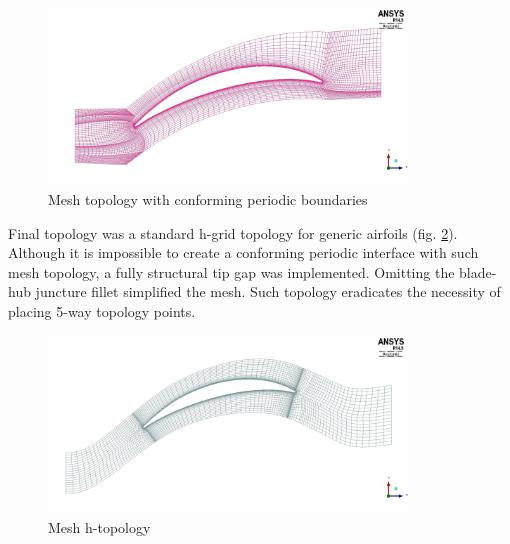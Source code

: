 \begin{figure}[h!]
\centering %
\includegraphics[width=0.85\textwidth]{Pictures/r67_cj.jpg}
\caption{Mesh topology with conforming periodic boundaries}
\label{cj_topo}
\end{figure}

Final topology was a standard h-grid topology for generic airfoils (fig. \ref{h_topo}). Although it is impossible to create a conforming periodic interface with such mesh topology, a fully structural tip gap was implemented. Omitting the blade-hub juncture fillet simplified the mesh.  Such topology eradicates the necessity of placing 5-way topology points.

\begin{figure}[h!]
\centering %
\includegraphics[width=0.85\textwidth]{Pictures/r67_htopo.jpg}
\caption{Mesh h-topology}
\label{h_topo}
\end{figure}


